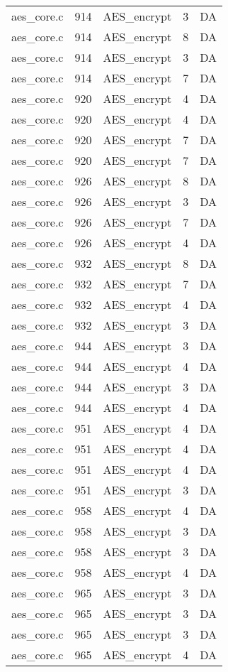 \begin{table*}
\begin{tabular}{clrrr}
aes\_core.c&914&AES\_encrypt&3 &DA\\
aes\_core.c&914&AES\_encrypt&8 &DA\\
aes\_core.c&914&AES\_encrypt&3 &DA\\
aes\_core.c&914&AES\_encrypt&7 &DA\\
aes\_core.c&920&AES\_encrypt&4 &DA\\
aes\_core.c&920&AES\_encrypt&4 &DA\\
aes\_core.c&920&AES\_encrypt&7 &DA\\
aes\_core.c&920&AES\_encrypt&7 &DA\\
aes\_core.c&926&AES\_encrypt&8 &DA\\
aes\_core.c&926&AES\_encrypt&3 &DA\\
aes\_core.c&926&AES\_encrypt&7 &DA\\
aes\_core.c&926&AES\_encrypt&4 &DA\\
aes\_core.c&932&AES\_encrypt&8 &DA\\
aes\_core.c&932&AES\_encrypt&7 &DA\\
aes\_core.c&932&AES\_encrypt&4 &DA\\
aes\_core.c&932&AES\_encrypt&3 &DA\\
aes\_core.c&944&AES\_encrypt&3 &DA\\
aes\_core.c&944&AES\_encrypt&4 &DA\\
aes\_core.c&944&AES\_encrypt&3 &DA\\
aes\_core.c&944&AES\_encrypt&4 &DA\\
aes\_core.c&951&AES\_encrypt&4 &DA\\
aes\_core.c&951&AES\_encrypt&4 &DA\\
aes\_core.c&951&AES\_encrypt&4 &DA\\
aes\_core.c&951&AES\_encrypt&3 &DA\\
aes\_core.c&958&AES\_encrypt&4 &DA\\
aes\_core.c&958&AES\_encrypt&3 &DA\\
aes\_core.c&958&AES\_encrypt&3 &DA\\
aes\_core.c&958&AES\_encrypt&4 &DA\\
aes\_core.c&965&AES\_encrypt&3 &DA\\
aes\_core.c&965&AES\_encrypt&3 &DA\\
aes\_core.c&965&AES\_encrypt&3 &DA\\
aes\_core.c&965&AES\_encrypt&4 &DA\\
\hline
\end{tabular}
\end{table*}